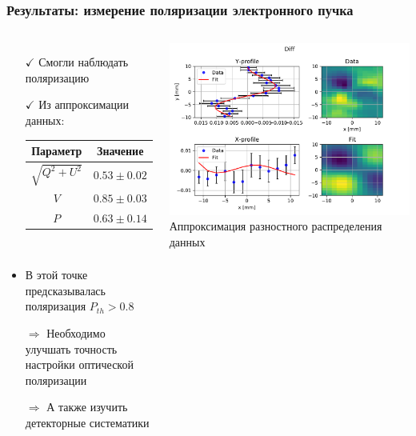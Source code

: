 \documentclass[12pt,aspectratio=169]{beamer}
\begin{document}
\begin{frame}[t]
	\frametitle{Результаты: измерение поляризации электронного пучка}
	\begin{columns}
		\begin{minipage}[t][1.\textheight]{\linewidth}
			\begin{itemize}
				\item[$\checkmark$] Смогли наблюдать поляризацию
				\item[$\checkmark$] Из аппроксимации данных:
					\begin{tabular}{|c|c|}
					\hline
					Параметр & Значение \\
					\hline
					$\sqrt{Q^2+U^2}$ &  \textcolor{calmOrange}{$0.53 \pm 0.02$}\\
					$V$ &  $0.85 \pm 0.03$ \\
					$P$ &   \textcolor{calmGreen}{$0.63 \pm  0.14$}\\
					\hline
				\end{tabular}\\
				\item В этой точке предсказывалась поляризация $P_{th} > 0.8$
				\item[$\Rightarrow$] Необходимо улучшать точность настройки оптической поляризации
				\item[$\Rightarrow$] А также изучить детекторные систематики
			\end{itemize}
		\end{minipage}%
		\begin{minipage}[t][1.\textheight]{\linewidth}
			\includegraphics[width=1\linewidth]{data_fit_diff_P063-014_Q053-003_V085-003.pdf}
			\footnotesize{Аппроксимация разностного распределения данных}
		\end{minipage}%
	\end{columns}	
\end{frame}
\end{document}
